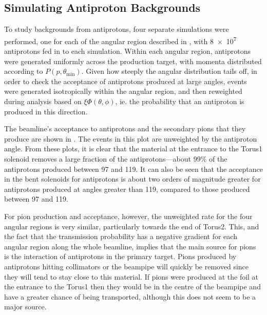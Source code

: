 \subsection{Simulating Antiproton Backgrounds}
\FigAntiprotonSimFluxes
To study backgrounds from antiprotons, four separate simulations were performed, one for each of the angular region described in , with \num{8e7} antiprotons fed in to each simulation.
Within each angular region, antiprotons were generated uniformly across the production target, with momenta distributed according to $P(p,\theta_\textrm{min})$.
Given how steeply the angular distribution tails off, in order to check the acceptance of antiprotons produced at large angles, events were generated isotropically within the angular region, and then reweighted during analysis based on $\xi\Phi(\theta,\phi)$, ie. the probability that an antiproton is produced in this direction.

The beamline's acceptance to antiprotons and the secondary pions that they produce are shown in .
The events in this plot are unweighted by the antiproton angle.
From these plots, it is clear that the material at the entrance to the Torus1 solenoid removes a large fraction of the antiprotons---about 99\% of the antiprotons produced between 97 and 119\degree.
It can also be seen that the acceptance in the bent solenoids for antiprotons is about two orders of magnitude greater for antiprotons produced at angles greater than 119\degree, compared to those produced between 97 and 119\degree.

For pion production and acceptance, however, the unweighted rate for the four angular regions is very similar, particularly towards the end of Torus2.
This, and the fact that the transmission probability has a negative gradient for each angular region along the whole beamline, implies that the main source for pions is the interaction of antiprotons in the primary target.
Pions produced by antiprotons hitting collimators or the beampipe will quickly be removed since they will tend to stay close to this material.
If pions were produced at the foil at the entrance to the Torus1 then they would be in the centre of the beampipe and have a greater chance of being transported, although this does not seem to be a major source.

\FigAntiprotonSimHeightsTwoDPbar
\FigAntiprotonSimHeightsTwoDPiMin
\TabAntiprotonResultsAntip
\TabAntiprotonResultsPiSecond
\afterpage{\clearpage}


